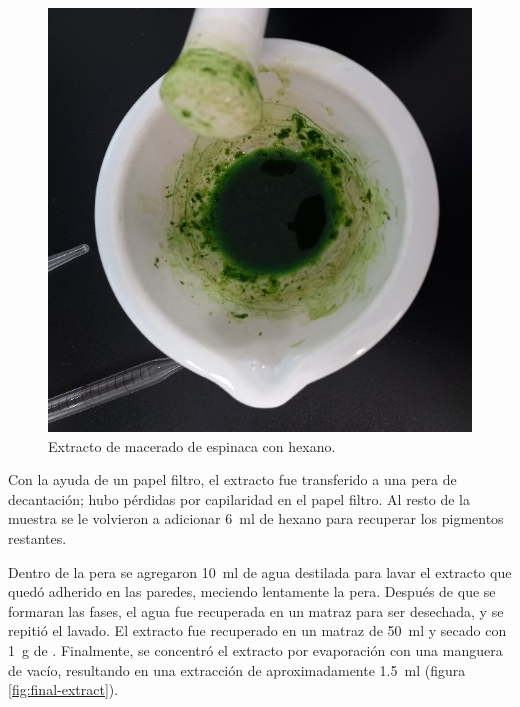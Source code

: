 \documentclass{ITESO-Report}
\begin{document}
\begin{figure}[htpb]
    \centering
    \includegraphics[width=0.9\columnwidth]{figuras/extract.jpg}
    \caption{Extracto de macerado de espinaca con hexano.}
    \label{fig:extract}
\end{figure}

Con la ayuda de un papel filtro, el extracto fue transferido a una pera de decantación; hubo pérdidas por capilaridad en el papel filtro. Al resto de la muestra se le volvieron a adicionar \qty{6}{\ml} de hexano para recuperar los pigmentos restantes.

Dentro de la pera se agregaron \qty{10}{\ml} de agua destilada para lavar el extracto que quedó adherido en las paredes, meciendo lentamente la pera. Después de que se formaran las fases, el agua fue recuperada en un matraz para ser desechada, y se repitió el lavado. El extracto fue recuperado en un matraz de \qty{50}{\ml} y secado con \qty{1}{\g} de . Finalmente, se concentró el extracto por evaporación con una manguera de vacío, resultando en una extracción de aproximadamente \qty{1.5}{\ml} (figura \ref{fig:final-extract}).
\end{document}

